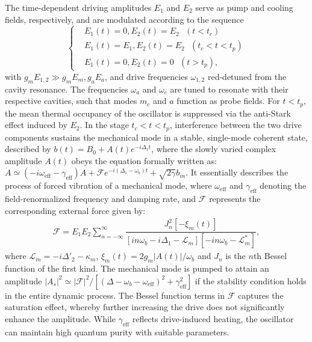 \documentclass[aps,prl,twocolumn,superscriptaddress]{revtex4-2}
\begin{document}
The time-dependent driving amplitudes $E_{1}$ and $E_{2}$ serve as pump and cooling fields, respectively, and are modulated according to the sequence
\begin{equation}
   \left\{
    \begin{aligned}
    &E_1(t)=0, E_2(t)=E_2\,\,\,\,(t<t_c) \\
    &E_1(t)=E_1, E_2(t)=E_2\,\,\,\,(t_c<t<t_p) \\
    &E_1(t)=0, E_2(t)=0\,\,\,\,(t>t_p),
    \end{aligned}
    \right.
\end{equation}
with $g_mE_{1,2}\gg g_mE_{m}, g_aE_{a}$, and drive frequencies $\omega_{1,2}$ red-detuned from the cavity resonance. The frequencies $\omega_a$ and $\omega_c$ are tuned to resonate with their respective cavities, such that modes $m_c$ and $a$ function as probe fields. For $t<t_p$, the mean thermal occupancy of the oscillator is suppressed via the anti-Stark effect induced by $E_2$. In the stage $t_c<t<t_p$, interference between the two drive components sustains the mechanical mode in a stable, single-mode coherent state, described by $b(t)=B_0+A(t)e^{-i\Delta_1 t}$, where the slowly varied complex amplitude $A(t)$ obeys the equation formally written as: $\dot{A}\simeq (-i\omega_{\text{eff}}-\gamma_{\text{eff}}) A+\mathcal{F}e^{-i(\Delta_1-\omega_b)t}+\sqrt{2\gamma}b_{in}$. It essentially describes the process of forced vibration of a mechanical mode, where $\omega_{\text{eff}}$ and $\gamma_{\text{eff}}$ denoting the field-renormalized frequency and damping rate, and $\mathcal{F}$ represents the corresponding external force given by:
\begin{equation}
\begin{split}
\mathcal{F}=E_1E_2\sum_{n=-\infty}^{\infty}\dfrac{J^2_n\left[-\xi_m(t)\right]}{[in\omega_b-i\Delta_1-\mathcal{L}_m][-in\omega_b-\mathcal{L}^*_m]},
\end{split}
\label{eq:F2 solution}
\end{equation}
where $\mathcal{L}_m=-i\Delta'_2-\kappa_m$, $\xi_m(t)=2g_m\vert A(t)\vert/\omega_b$ and $J_n$ is the $n$th Bessel function of the first kind. The mechanical mode is pumped to attain an amplitude $\vert A_s\vert^2\simeq {\vert \mathcal{F}\vert^2}/{[(\Delta-\omega_b-\omega_{\text{eff}})^2+\gamma^2_{\text{eff}}]}$ if the stability condition holds in the entire dynamic process. The Bessel function terms in $\mathcal{F}$ captures the saturation effect, whereby further increasing the drive does not significantly enhance the amplitude. While $\gamma_{\text{eff}}$ reflects drive-induced heating, the oscillator can maintain high quantum purity with suitable parameters.
\end{document}
